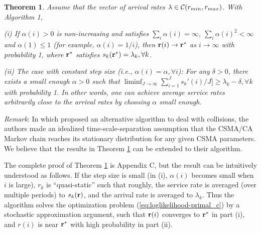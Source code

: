 \documentclass{IEEEtran}
\newtheorem{thm}{Theorem}
\begin{document}
\begin{thm}
\label{thm:scheduling}Assume that the vector of arrival rates ${\bf \lambda}\in{\cal C}(r_{min},r_{max})$.
With Algorithm 1, 

(i) If $\alpha(i)>0$ is non-increasing and satisfies $\sum_{i}\alpha(i)=\infty$,
$\sum_{i}\alpha(i)^{2}<\infty$ and $\alpha(1)\le1$ (for example,
$\alpha(i)=1/i$), then ${\bf r}(i)\rightarrow{\bf r}^{*}$ as $i\rightarrow\infty$
with probability 1, where ${\bf r}^{*}$ satisfies $s_{k}({\bf r}^{*})=\lambda_{k},\forall k$.

(ii) The case with constant step size (i.e., $\alpha(i)=\alpha,\forall i$):
For any $\delta>0$, there exists a small enough $\alpha>0$ such
that $\liminf_{J\rightarrow\infty}\sum_{i=1}^{J}s_{k}'(i)/J]\ge\lambda_{k}-\delta,\forall k$
with probability 1. In other words, one can achieve average service
rates arbitrarily close to the arrival rates by choosing $\alpha$
small enough.
\end{thm}
\emph{Remark}: In \cite{Jian} which proposed an alternative algorithm
to deal with collisions, the authors made an idealized time-scale-separation
assumption that the CSMA/CA Markov chain reaches its stationary distribution
for any given CSMA parameters. We believe that the results in Theorem
\ref{thm:scheduling} can be extended to their algorithm.

The complete proof of Theorem \ref{thm:scheduling} is Appendix C,
but the result can be intuitively understood as follows. If the step
size is small (in (i), $\alpha(i)$ becomes small when $i$ is large),
$r_{k}$ is {}``quasi-static'' such that roughly, the service rate
is averaged (over multiple periods) to $s_{k}({\bf r})$, and the
arrival rate is averaged to $\lambda_{k}$. Thus the algorithm solves
the optimization problem (\ref{eq:loglikelihood-primal_c}) by a stochastic
approximation \cite{Borkar} argument, such that ${\bf r}(i)$ converges
to ${\bf r}^{*}$ in part (i), and $r(i)$ is near ${\bf r}^{*}$
with high probability in part (ii). \begin{comment}
(In part (i), it can be further shown that the system is rate stable
\cite{longer_version}.) 
\end{comment}
{}

\medskip{}
\end{document}
